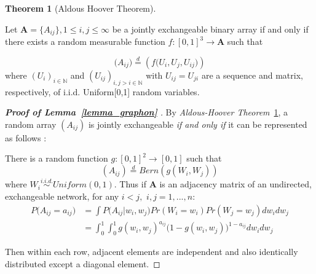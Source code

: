 \documentclass[12pt]{article}
\theoremstyle{definition}
\newtheorem{theorem}{Theorem}[section]
\begin{document}
\begin{theorem}[Aldous Hoover Theorem]
		\label{Aldous_Hoover}
		
		Let $\mathbf{A} = \{A_{ij}\}, 1 \leq i,j \leq \infty$ be a jointly exchangeable binary array if and only if there exists a random measurable function $f : [0,1]^{3} \rightarrow \mathbf{A}$ such that 
		
		\begin{equation}
		\big(  A_{ij}  \big) \stackrel{d}{=} \left( f \big( U_{i}, U_{j}, U_{ij} \big)  \right)
		\end{equation}
		where $(U_{i})_{i \in \mathbb{N}}$ and $(U_{ij})_{i,j > i \in \mathbb{N}}$ with $U_{ij} = U_{ji}$ are a sequence and matrix, respectively, of i.i.d. Uniform[0,1] random variables. 
\end{theorem}
	
\begin{proof}[\textbf{Proof of Lemma~\ref{lemma_graphon} }] 
	By \textit{Aldous-Hoover Theorem}~\ref{Aldous_Hoover}, a random array $(A_{ij})$ is jointly exchangeable \textit{if and only if} it can be represented as follows : 
		
	There is a random function $g : [0,1]^2 \rightarrow [0,1]$ such that 
\begin{equation}
(A_{ij})  \stackrel{d}{=} Bern( g(W_{i}, W_{j}))
\end{equation}
where $W_{i} \overset{i.i.d.}{\sim} Uniform(0,1)$. Thus if $\mathbf{A}$ is an adjacency matrix of an undirected, exchangeable network, for any $i < j,$ $i,j = 1,... , n$:
\begin{equation}
\begin{split}
	P \big(  A_{ij} = a_{ij} \big) & = \int P \big( A_{ij} \big| w_{i}, w_{j} \big) Pr(W_{i} = w_{i}) Pr(W_{j} = w_{j}) dw_{i} dw_{j} \\ & = \int_{0}^{1} \int_{0}^{1} g( w_{i},  w_{j})^{a_{ij}} \big( 1- g( w_{i},  w_{j}) \big)^{1-a_{ij}} dw_{i} dw_{j} 
\end{split}
\end{equation}
		
Then within each row, adjacent elements are independent and also identically distributed except a diagonal element.

\end{proof}
	
\end{document}
